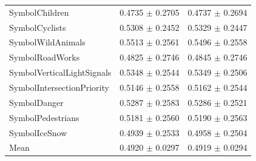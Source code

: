 \begin{longtable}{@{}lrr@{}}
SymbolChildren & 0.4735 $\pm$ 0.2705 & 0.4737 $\pm$ 0.2694 \\
SymbolCyclists & 0.5308 $\pm$ 0.2452 & 0.5329 $\pm$ 0.2447 \\
SymbolWildAnimals & 0.5513 $\pm$ 0.2561 & 0.5496 $\pm$ 0.2558 \\
SymbolRoadWorks & 0.4825 $\pm$ 0.2746 & 0.4845 $\pm$ 0.2746 \\
SymbolVerticalLightSignals & 0.5348 $\pm$ 0.2544 & 0.5349 $\pm$ 0.2506 \\
SymbolIntersectionPriority & 0.5146 $\pm$ 0.2558 & 0.5162 $\pm$ 0.2544 \\
SymbolDanger & 0.5287 $\pm$ 0.2583 & 0.5286 $\pm$ 0.2521 \\
SymbolPedestrians & 0.5181 $\pm$ 0.2560 & 0.5190 $\pm$ 0.2563 \\
SymbolIceSnow & 0.4939 $\pm$ 0.2533 & 0.4958 $\pm$ 0.2504 \\
Mean & 0.4920 $\pm$ 0.0297 & 0.4919 $\pm$ 0.0294 \\
\end{longtable}
